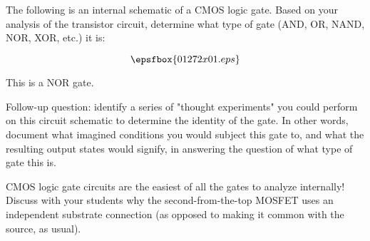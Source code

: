 

The following is an internal schematic of a CMOS logic gate.  Based on your analysis of the transistor circuit, determine what type of gate (AND, OR, NAND, NOR, XOR, etc.) it is:

$$\epsfbox{01272x01.eps}$$







This is a NOR gate.

\vskip 10pt

Follow-up question: identify a series of "thought experiments" you could perform on this circuit schematic to determine the identity of the gate.  In other words, document what imagined conditions you would subject this gate to, and what the resulting output states would signify, in answering the question of what type of gate this is.







CMOS logic gate circuits are the easiest of all the gates to analyze internally!  Discuss with your students why the second-from-the-top MOSFET uses an independent substrate connection (as opposed to making it common with the source, as usual).




